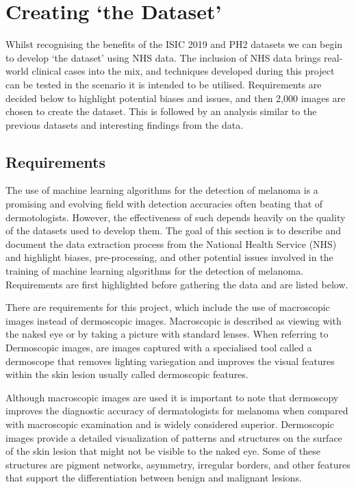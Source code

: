 \pagebreak

\section{Creating `the Dataset'}
Whilst recognising the benefits of the ISIC 2019 and PH2 datasets we can begin to develop `the dataset' using NHS data. The inclusion of NHS data brings real-world clinical cases into the mix, and techniques developed during this project can be tested in the scenario it is intended to be utilised. Requirements are decided below to highlight potential biases and issues, and then 2,000 images are chosen to create the dataset. This is followed by an analysis similar to the previous datasets and interesting findings from the data.


\subsection{Requirements}
The use of machine learning algorithms for the detection of melanoma is a promising and evolving field with detection accuracies often beating that of dermotologists\cite{Andre2017}. However, the effectiveness of such depends heavily on the quality of the datasets used to develop them\cite{Tae2019}. The goal of this section is to describe and document the data extraction process from the National Health Service (NHS) and highlight biases, pre-processing, and other potential issues involved in the training of machine learning algorithms for the detection of melanoma. Requirements are first highlighted before gathering the data and are listed below.

There are requirements for this project, which include the use of macroscopic images instead of dermoscopic images. Macroscopic is described as viewing with the naked eye or by taking a picture with standard lenses. When referring to Dermoscopic images, are images captured with a specialised tool called a dermoscope that removes lighting variegation and improves the visual features within the skin lesion usually called dermoscopic features.

Although macroscopic images are used it is important to note that dermoscopy improves the diagnostic accuracy of dermatologists for melanoma when compared with macroscopic examination\cite{Wolner2017} and is widely considered superior\cite{Thiers2009}. Dermoscopic images provide a detailed visualization of patterns and structures on the surface of the skin lesion that might not be visible to the naked eye\cite{Thiers2009}. Some of these structures are pigment networks, asymmetry, irregular borders, and other features that support the differentiation between benign and malignant lesions\cite{Thiers2009}. 

